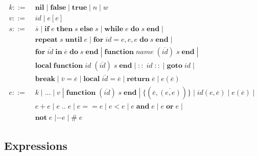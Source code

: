 \documentclass[12pt]{article}
\newcommand{\pipe}{\;|\;}
\begin{document}
\begin{align*}
k ::= \; & \mathbf{nil} \pipe \mathbf{false} \pipe \mathbf{true}
\pipe n \pipe w\\ 
v ::= \; & id \pipe e[e]\\
s ::= \; & \overline{s}
\pipe \mathbf{if} \; e \; \mathbf{then} \; s \; \mathbf{else} \; s
\pipe \mathbf{while} \; e \; \mathbf{do} \; s \; \mathbf{end} \pipe\\
& \mathbf{repeat} \; s \; \mathbf{until} \; e
\pipe \mathbf{for} \; id = e,e,e \; \mathbf{do} \; s \; \mathbf{end} \pipe\\
& \mathbf{for} \; \overline{id} \; \mathbf{in} \; \overline{e} \;
  \mathbf{do} \; s \; \mathbf{end}
\pipe \mathbf{function} \; name \;
  (\overline{id}) \; s \; \mathbf{end} \pipe\\
& \mathbf{local} \; \mathbf{function} \; id \;
  (\overline{id}) \; s \; \mathbf{end}
\pipe \mathbf{::} \; id \; \mathbf{::} \pipe \mathbf{goto} \; id \pipe\\
& \mathbf{break} \pipe \overline{v} = \overline{e}
\pipe \mathbf{local} \; \overline{id} = \overline{e}
\pipe \mathbf{return} \; \overline{e} \pipe e(\overline{e})\\
e ::= \; & k \pipe {...} \pipe v
\pipe \mathbf{function} \; (\overline{id}) \; s \; \mathbf{end}
\pipe \{(\overline{e},\overline{(e,e)})\}
\pipe id(e,\overline{e}) \pipe e(\overline{e}) \pipe\\
& e + e \pipe e \; {..} \; e \pipe e == e \pipe e < e
\pipe e \; \mathbf{and} \; e \pipe e \; \mathbf{or} \; e \pipe\\
& \mathbf{not} \; e \; | - e \pipe \# \; e
\end{align*}

\subsection{Expressions}
\end{document}
